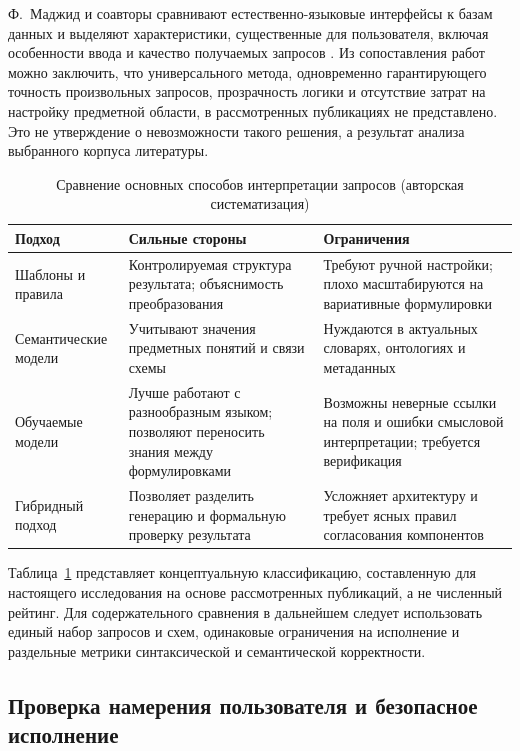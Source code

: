 Ф.~Маджид и соавторы сравнивают естественно-языковые интерфейсы к базам данных и выделяют характеристики, существенные для пользователя, включая особенности ввода и качество получаемых запросов \cite{majeed2022}. Из сопоставления работ можно заключить, что универсального метода, одновременно гарантирующего точность произвольных запросов, прозрачность логики и отсутствие затрат на настройку предметной области, в рассмотренных публикациях не представлено. Это не утверждение о невозможности такого решения, а результат анализа выбранного корпуса литературы.

\begin{table}[htbp]
\caption{Сравнение основных способов интерпретации запросов (авторская систематизация)}
\label{tab:approaches}
\small
\begin{tabularx}{\textwidth}{|p{30mm}|X|X|}
\hline
\textbf{Подход} & \textbf{Сильные стороны} & \textbf{Ограничения} \\\hline
Шаблоны и правила & Контролируемая структура результата; объяснимость преобразования & Требуют ручной настройки; плохо масштабируются на вариативные формулировки \\\hline
Семантические модели & Учитывают значения предметных понятий и связи схемы & Нуждаются в актуальных словарях, онтологиях и метаданных \\\hline
Обучаемые модели & Лучше работают с разнообразным языком; позволяют переносить знания между формулировками & Возможны неверные ссылки на поля и ошибки смысловой интерпретации; требуется верификация \\\hline
Гибридный подход & Позволяет разделить генерацию и формальную проверку результата & Усложняет архитектуру и требует ясных правил согласования компонентов \\\hline
\end{tabularx}
\end{table}

Таблица~\ref{tab:approaches} представляет концептуальную классификацию, составленную для настоящего исследования на основе рассмотренных публикаций, а не численный рейтинг. Для содержательного сравнения в дальнейшем следует использовать единый набор запросов и схем, одинаковые ограничения на исполнение и раздельные метрики синтаксической и семантической корректности.

\subsection{Проверка намерения пользователя и безопасное исполнение}

